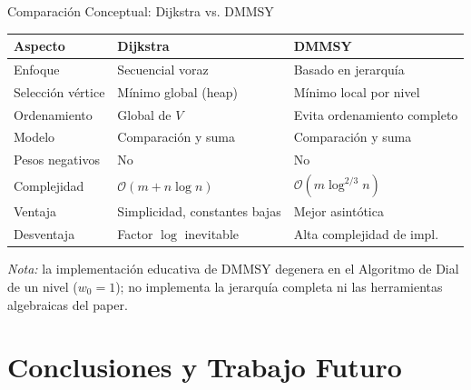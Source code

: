 \documentclass[aspectratio=169,12pt]{beamer}
\begin{document}
\begin{frame}{Comparación Conceptual: Dijkstra vs. DMMSY}
  \begin{center}
  \scriptsize
  \begin{tabular}{l C{3.0cm} C{3.0cm}}
    \toprule
    \textbf{Aspecto} & \textbf{Dijkstra} & \textbf{DMMSY}\\
    \midrule
    Enfoque            & Secuencial voraz     & Basado en jerarquía\\
    Selección vértice  & Mínimo global (heap) & Mínimo local por nivel\\
    Ordenamiento       & Global de $V$        & Evita ordenamiento completo\\
    Modelo             & Comparación y suma   & Comparación y suma\\
    Pesos negativos    & No                   & No\\
    Complejidad        & $\mathcal{O}(m+n\log n)$ & $\mathcal{O}(m\log^{2/3}n)$\\
    Ventaja            & Simplicidad, constantes bajas & Mejor asintótica\\
    Desventaja         & Factor $\log$ inevitable & Alta complejidad de impl.\\
    \bottomrule
  \end{tabular}
  \end{center}
  \vspace{0.15cm}
  \begin{center}
    \footnotesize\textit{Nota:} la implementación educativa de DMMSY degenera en el Algoritmo de Dial
    de un nivel ($w_0=1$); no implementa la jerarquía completa ni las herramientas algebraicas del paper.
  \end{center}
\end{frame}

\section{Conclusiones y Trabajo Futuro}
\end{document}
